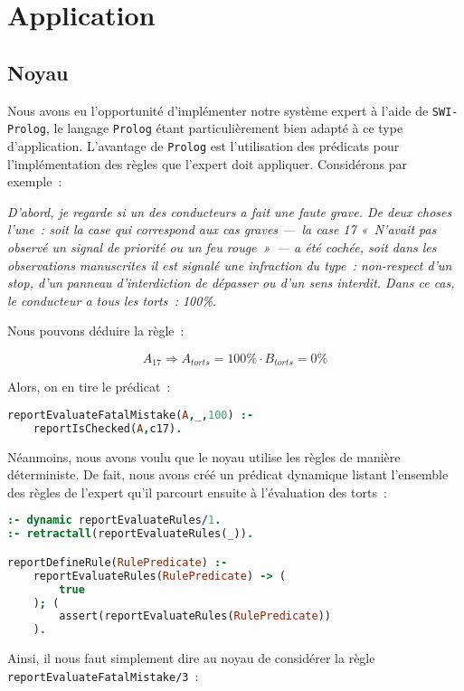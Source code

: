 \chapter{Application}

\section{Noyau}

Nous avons eu l'opportunité d'implémenter notre système expert à l'aide de \texttt{SWI-Prolog}, le langage \texttt{Prolog} étant particulièrement bien adapté à ce type d'application.
L'avantage de \texttt{Prolog} est l'utilisation des prédicats pour l'implémentation des règles que l'expert doit appliquer. Considérons par exemple~:

\textit{D'abord, je regarde si un des conducteurs a fait une faute grave. De deux choses l'une~: soit la case qui correspond aux cas graves ---~la case
17 «~N'avait pas observé un signal de priorité ou un feu rouge~»~--- a été cochée, soit dans les observations manuscrites il est signalé une
infraction du type~: non-respect d'un stop, d'un panneau d'interdiction de dépasser ou d'un sens interdit. Dans ce cas, le conducteur a tous
les torts~: 100\%.}

Nous pouvons déduire la règle~:

\[A_{17} \Rightarrow A_{torts} = 100\% \cdot B_{torts} = 0\%\]

Alors, on en tire le prédicat~:

\begin{lstlisting}[language=Prolog,frame=single]
reportEvaluateFatalMistake(A,_,100) :-
    reportIsChecked(A,c17).
\end{lstlisting}

Néanmoins, nous avons voulu que le noyau utilise les règles de manière déterministe. De fait, nous avons créé un prédicat dynamique listant l'ensemble
des règles de l'expert qu'il parcourt ensuite à l'évaluation des torts~:

\begin{lstlisting}[language=Prolog,frame=single]
:- dynamic reportEvaluateRules/1.
:- retractall(reportEvaluateRules(_)).

reportDefineRule(RulePredicate) :-
    reportEvaluateRules(RulePredicate) -> (
        true
    ); (
        assert(reportEvaluateRules(RulePredicate))
    ).
\end{lstlisting}

Ainsi, il nous faut simplement dire au noyau de considérer la règle \texttt{reportEvaluateFatalMistake/3}~:

